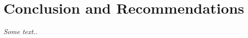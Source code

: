 \setlength{\footskip}{8mm}

\chapter{Conclusion and Recommendations}
\label{ch:conclusion}

\textit{Some text..}

\FloatBarrier

